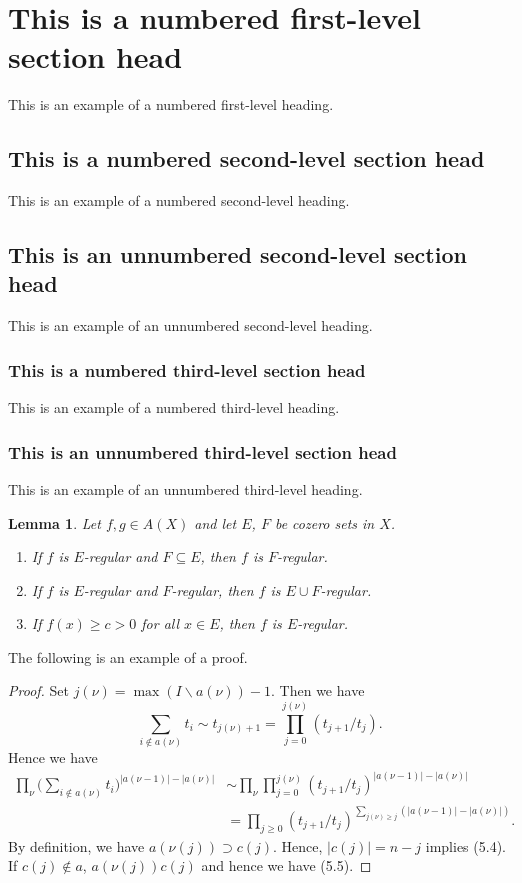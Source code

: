 \documentclass{amsart}
\newtheorem{lemma}[theorem]{Lemma}
\theoremstyle{definition}
\theoremstyle{remark}
\numberwithin{equation}{section}
\newcommand{\abs}[1]{\lvert#1\rvert}
\begin{document}
\section{This is a numbered first-level section head}
This is an example of a numbered first-level heading.

\subsection{This is a numbered second-level section head}
This is an example of a numbered second-level heading.

\subsection*{This is an unnumbered second-level section head}
This is an example of an unnumbered second-level heading.

\subsubsection{This is a numbered third-level section head}
This is an example of a numbered third-level heading.

\subsubsection*{This is an unnumbered third-level section head}
This is an example of an unnumbered third-level heading.

\begin{lemma}
Let $f, g\in  A(X)$ and let $E$, $F$ be cozero
sets in $X$.
\begin{enumerate}
\item If $f$ is $E$-regular and $F\subseteq E$, then $f$ is $F$-regular.

\item If $f$ is $E$-regular and $F$-regular, then $f$ is $E\cup
F$-regular.

\item If $f(x)\ge c>0$ for all $x\in E$, then $f$ is $E$-regular.

\end{enumerate}
\end{lemma}

The following is an example of a proof.

\begin{proof} Set $j(\nu)=\max(I\backslash a(\nu))-1$. Then we have
\[
\sum_{i\notin a(\nu)}t_i\sim t_{j(\nu)+1}
  =\prod^{j(\nu)}_{j=0}(t_{j+1}/t_j).
\]
Hence we have
\begin{equation}
\begin{split}
\prod_\nu\biggl(\sum_{i\notin
  a(\nu)}t_i\biggr)^{\abs{a(\nu-1)}-\abs{a(\nu)}}
&\sim\prod_\nu\prod^{j(\nu)}_{j=0}
  (t_{j+1}/t_j)^{\abs{a(\nu-1)}-\abs{a(\nu)}}\\
&=\prod_{j\ge 0}(t_{j+1}/t_j)^{
  \sum_{j(\nu)\ge j}(\abs{a(\nu-1)}-\abs{a(\nu)})}.
\end{split}
\end{equation}
By definition, we have $a(\nu(j))\supset c(j)$. Hence, $\abs{c(j)}=n-j$
implies (5.4). If $c(j)\notin a$, $a(\nu(j))c(j)$ and hence
we have (5.5).
\end{proof}
\end{document}
